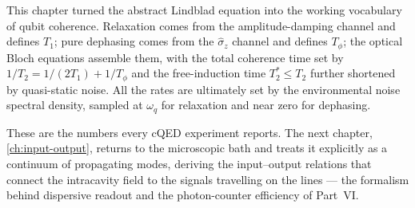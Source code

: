 This chapter turned the abstract Lindblad equation into the
working vocabulary of qubit coherence. Relaxation comes from the
amplitude-damping channel and defines $T_1$; pure dephasing comes
from the $\hat\sigma_z$ channel and defines $T_\phi$; the optical
Bloch equations assemble them, with the total coherence time set by
$1/T_2=1/(2T_1)+1/T_\phi$ and the free-induction time $T_2^*\leq T_2$
further shortened by quasi-static noise. All the rates are
ultimately set by the environmental noise spectral density,
sampled at $\omega_q$ for relaxation and near zero for dephasing.

These are the numbers every cQED experiment reports. The next
chapter, \cref{ch:input-output}, returns to the microscopic bath
and treats it explicitly as a continuum of propagating modes,
deriving the input--output relations that connect the intracavity
field to the signals travelling on the lines --- the formalism
behind dispersive readout and the photon-counter efficiency of
Part~VI.

